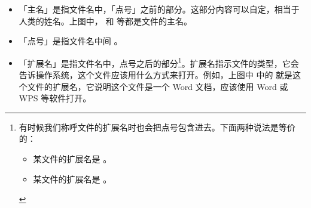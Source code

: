 \begin{itemize}
  \item 「主名」是指文件名中，「点号」之前的部分。这部分内容可以自定，相当于人类的姓名。上图中， 和  等都是文件的主名。
  \item 「点号」是指文件名中间 。
  \item 「扩展名」是指文件名中，点号之后的部分\cprotect\footnote{有时候我们称呼文件的扩展名时也会把点号包含进去。下面两种说法是等价的：
    \begin{itemize}
      \item 某文件的扩展名是 。
      \item 某文件的扩展名是 。
    \end{itemize}
  }。扩展名指示文件的类型，它会告诉操作系统，这个文件应该用什么方式来打开。例如，上图中  中的  就是这个文件的扩展名，它说明这个文件是一个 Word 文档，应该使用 Word 或 WPS 等软件打开。
\end{itemize}

